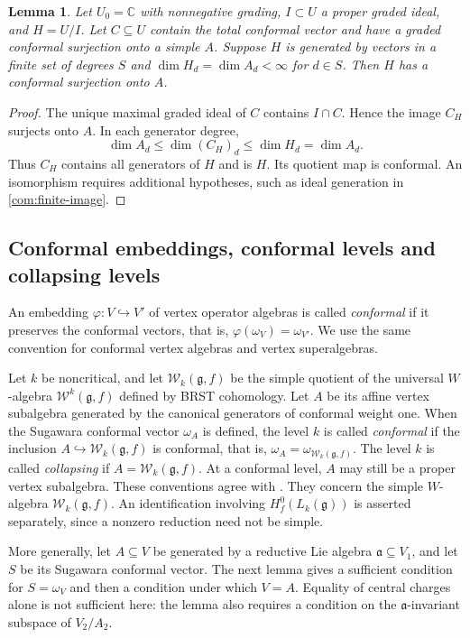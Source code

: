 \documentclass[11pt,a4paper]{amsart}
\numberwithin{equation}{section}
\newtheorem{lemma}[theorem]{Lemma}
\theoremstyle{definition}
\theoremstyle{remark}
\newcommand{\C}{\mathbb C}
\newcommand{\g}{\mathfrak g}
\begin{document}
\begin{lemma}
\label{vtwo:small-subalgebra}
Let $U_0=\C$ with nonnegative grading, $I\subset U$ a proper graded
ideal, and $H=U/I$. Let $C\subseteq U$ contain the total conformal
vector and have a graded conformal surjection onto a simple $A$.
Suppose $H$ is generated by vectors in a finite set of degrees $S$ and
$\dim H_d=\dim A_d<\infty$ for $d\in S$. Then $H$ has a conformal
surjection onto $A$.
\end{lemma}
\begin{proof}
The unique maximal graded ideal of $C$ contains $I\cap C$. Hence the
image $C_H$ surjects onto $A$. In each generator degree,
$$
 \dim A_d\le\dim(C_H)_d\le\dim H_d=\dim A_d.
$$
Thus $C_H$ contains all generators of $H$ and is $H$. Its quotient map is conformal. An isomorphism requires additional
hypotheses, such as ideal generation in \cref{com:finite-image}.
\end{proof}

\subsection{Conformal embeddings, conformal levels and collapsing levels}

An embedding $\varphi:V\hookrightarrow V'$ of vertex operator algebras
is called \emph{conformal} if it preserves the conformal vectors,
that is, $\varphi(\omega_V)=\omega_{V'}$. We use the same convention
for conformal vertex algebras and vertex superalgebras.

Let $k$ be noncritical, and let $\mathcal W_k(\g,f)$ be the simple
quotient of the universal $W$-algebra $\mathcal W^k(\g,f)$ defined
by BRST cohomology. Let $A$ be its affine vertex subalgebra generated
by the canonical generators of conformal weight one. When the Sugawara
conformal vector $\omega_A$ is defined, the level $k$ is called
\emph{conformal} if the inclusion $A\hookrightarrow\mathcal W_k(\g,f)$
is conformal, that is, $\omega_A=\omega_{\mathcal W_k(\g,f)}$.
The level $k$ is called \emph{collapsing} if
$A=\mathcal W_k(\g,f)$. At a conformal level, $A$ may still be a proper
vertex subalgebra. These conventions agree with
\cite[Sections~3--4]{AdamovicEtAl2018}. They concern the simple
$W$-algebra $\mathcal W_k(\g,f)$. An identification involving
$H_f^0(L_k(\g))$ is asserted separately, since a nonzero reduction
need not be simple.

More generally, let $A\subseteq V$ be generated by a reductive Lie
algebra $\mathfrak a\subseteq V_1$, and let $S$ be its Sugawara
conformal vector. The next lemma gives a sufficient condition for
$S=\omega_V$ and then a condition under which $V=A$. Equality of
central charges alone is not sufficient here: the lemma also requires
a condition on the $\mathfrak a$-invariant subspace of $V_2/A_2$.
\end{document}
